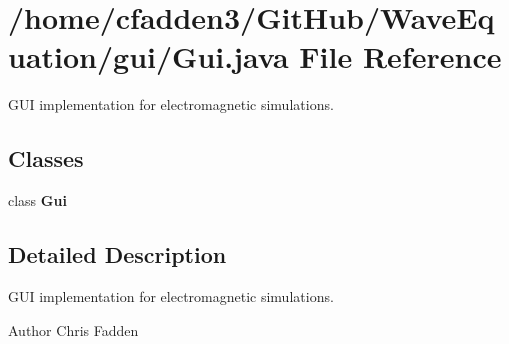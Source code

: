 \section{/home/cfadden3/\+Git\+Hub/\+Wave\+Equation/gui/\+Gui.java File Reference}
\label{_gui_8java}


G\+U\+I implementation for electromagnetic simulations.  


\subsection*{Classes}
\begin{DoxyCompactItemize}
\item 
class {\bf Gui}
\end{DoxyCompactItemize}


\subsection{Detailed Description}
G\+U\+I implementation for electromagnetic simulations. 

\begin{DoxyAuthor}{Author}
Chris Fadden 
\end{DoxyAuthor}
